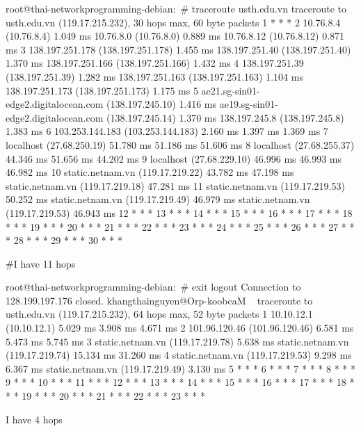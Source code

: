 root@thai-networkprogramming-debian:~# traceroute usth.edu.vn
traceroute to usth.edu.vn (119.17.215.232), 30 hops max, 60 byte packets
 1  * * *
 2  10.76.8.4 (10.76.8.4)  1.049 ms 10.76.8.0 (10.76.8.0)  0.889 ms 10.76.8.12 (10.76.8.12)  0.871 ms
 3  138.197.251.178 (138.197.251.178)  1.455 ms 138.197.251.40 (138.197.251.40)  1.370 ms 138.197.251.166 (138.197.251.166)  1.432 ms
 4  138.197.251.39 (138.197.251.39)  1.282 ms 138.197.251.163 (138.197.251.163)  1.104 ms 138.197.251.173 (138.197.251.173)  1.175 ms
 5  ae21.sg-sin01-edge2.digitalocean.com (138.197.245.10)  1.416 ms ae19.sg-sin01-edge2.digitalocean.com (138.197.245.14)  1.370 ms 138.197.245.8 (138.197.245.8)  1.383 ms
 6  103.253.144.183 (103.253.144.183)  2.160 ms  1.397 ms  1.369 ms
 7  localhost (27.68.250.19)  51.780 ms  51.186 ms  51.606 ms
 8  localhost (27.68.255.37)  44.346 ms  51.656 ms  44.202 ms
 9  localhost (27.68.229.10)  46.996 ms  46.993 ms  46.982 ms
10  static.netnam.vn (119.17.219.22)  43.782 ms  47.198 ms static.netnam.vn (119.17.219.18)  47.281 ms
11  static.netnam.vn (119.17.219.53)  50.252 ms static.netnam.vn (119.17.219.49)  46.979 ms static.netnam.vn (119.17.219.53)  46.943 ms
12  * * *
13  * * *
14  * * *
15  * * *
16  * * *
17  * * *
18  * * *
19  * * *
20  * * *
21  * * *
22  * * *
23  * * *
24  * * *
25  * * *
26  * * *
27  * * *
28  * * *
29  * * *
30  * * *

#I have 11 hops

root@thai-networkprogramming-debian:~# exit
logout
Connection to 128.199.197.176 closed.
khangthainguyen@Orp-koobcaM ~ %
traceroute to usth.edu.vn (119.17.215.232), 64 hops max, 52 byte packets
 1  10.10.12.1 (10.10.12.1)  5.029 ms  3.908 ms  4.671 ms
 2  101.96.120.46 (101.96.120.46)  6.581 ms  5.473 ms  5.745 ms
 3  static.netnam.vn (119.17.219.78)  5.638 ms
    static.netnam.vn (119.17.219.74)  15.134 ms  31.260 ms
 4  static.netnam.vn (119.17.219.53)  9.298 ms  6.367 ms
    static.netnam.vn (119.17.219.49)  3.130 ms
 5  * * *
 6  * * *
 7  * * *
 8  * * *
 9  * * *
10  * * *
11  * * *
12  * * *
13  * * *
14  * * *
15  * * *
16  * * *
17  * * *
18  * * *
19  * * *
20  * * *
21  * * *
22  * * *
23  * * *

I have 4 hops